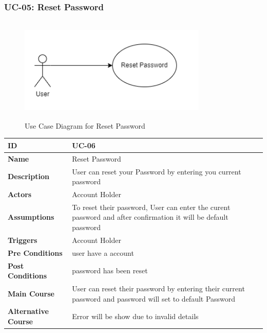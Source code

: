     \subsubsection{UC-05: Reset Password}
    \begin{figure}[H]
        \includegraphics[height=5cm, width=0.8\textwidth]{./diagrams/Use Case/u5.png}
        \centering 
        \caption{Use Case Diagram for Reset Password}
        \label{fig:Usecase1}
        \end{figure}
        
    \begin{center}
        \begin{tabularx}{\textwidth}{|l|X|}
            \hline
            \textbf{ID} & UC-06 \\
            \hline
            \textbf{Name} & Reset Password \\
            \hline
            \textbf{Description} & User can reset your Password by entering you current password \\
            \hline
            \textbf{Actors} & Account Holder \\
            \hline
            \textbf{Assumptions} & To reset their password, User can enter the curent password and after confirmation it will be default password  \\
            \hline
            \textbf{Triggers} & Account Holder \\
            \hline
            \textbf{Pre Conditions} & user have a account \\
            \hline
            \textbf{Post Conditions} & password has been reset \\
            \hline
            \textbf{Main Course} & User can reset their password by entering their current password and password will set to default Password \\
            \hline
            \textbf{Alternative Course} & Error will be show due to invalid details \\
            \hline
            
        \end{tabularx}
    \end{center}
    \newpage
    

